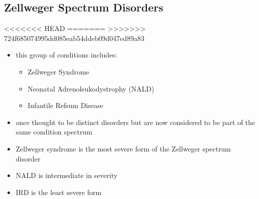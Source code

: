 \documentclass[fontsize=12pt]{scrartcl}
\begin{document}
\begin{enumerate}
\begin{enumerate}
\begin{enumerate}
\begin{enumerate}
\begin{table}[htbp]
\begin{enumerate}
\begin{enumerate}
\begin{enumerate}
\begin{enumerate}
\begin{enumerate}
\begin{enumerate}
\begin{enumerate}
\begin{enumerate}
\subsection{Zellweger Spectrum Disorders}
<<<<<<< HEAD
\label{sec:org48b9a63}
=======
\label{sec:orgad6e6b7}
>>>>>>> 724f685074995dd085eab54ddeb09d047ed89a83
\begin{itemize}
\item this group of conditions includes:
\begin{itemize}
\item Zellweger Syndrome
\item Neonatal Adrenoleukodystrophy (NALD)
\item Infantile Refsum Disease
\end{itemize}
\item once thought to be distinct disorders but are now considered to be
part of the same condition spectrum
\item Zellweger syndrome is the most severe form of the Zellweger spectrum disorder
\item NALD is intermediate in severity
\item IRD is the least severe form
\end{itemize}


\end{enumerate}
\end{enumerate}
\end{enumerate}
\end{enumerate}
\end{enumerate}
\end{enumerate}
\end{enumerate}
\end{enumerate}
\end{table}
\end{enumerate}
\end{enumerate}
\end{enumerate}
\end{enumerate}
\end{document}
